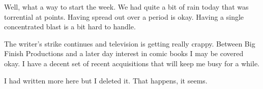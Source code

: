 Well, what a way to start the week. We had quite a bit of rain today
that was torrential at points. Having spread out over a period is okay.
Having a single concentrated blast is a bit hard to handle.

The writer's strike continues and television is getting really crappy.
Between Big Finish Productions and a later day interest in comic books I
may be covered okay. I have a decent set of recent acquisitions that
will keep me busy for a while.

I had written more here but I deleted it. That happens, it seems.
